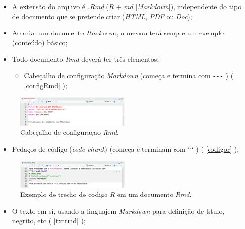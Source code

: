 \documentclass[]{book}
\providecommand{\tightlist}{%
  \setlength{\itemsep}{0pt}\setlength{\parskip}{0pt}}
\begin{document}
\begin{itemize}
\tightlist
\item
  A extensão do arquivo é \emph{.Rmd} (\emph{R} + \emph{md} {[}\emph{Markdown}{]}), independente do tipo de documento que se pretende criar (\emph{HTML}, \emph{PDF} ou \emph{Doc});\\
\item
  Ao criar um documento \emph{Rmd} novo, o mesmo terá sempre um exemplo (conteúdo) básico;\\
\item
  Todo documento \emph{Rmd} deverá ter três elementos:

  \begin{itemize}
  \tightlist
  \item
    Cabeçalho de configuração \emph{Markdown} (começa e termina com \texttt{-\/-\/-} ) ( \autoref{configRmd} );
  \end{itemize}
\end{itemize}

\begin{figure}
\centering
\includegraphics[width=0.5\textwidth,height=\textheight]{./img/CabecalhoConfig.png}
\caption{Cabeçalho de configuração \emph{Rmd}. \label{configRmd}}
\end{figure}

\begin{itemize}
\tightlist
\item
  Pedaços de código (\emph{code chunk}) (começa e terminam com \texttt{} ``` ) ( \autoref{codigor} );
\end{itemize}

\begin{figure}
\centering
\includegraphics[width=0.5\textwidth,height=\textheight]{./img/CodigoR.png}
\caption{Exemplo de trecho de codigo \emph{R} em um documento \emph{Rmd}. \label{codigor}}
\end{figure}

\begin{itemize}
\tightlist
\item
  O texto em sí, usando a linguajem \emph{Markdown} para definição de título, negrito, etc ( \autoref{txtrmd} );
\end{itemize}
\end{document}
